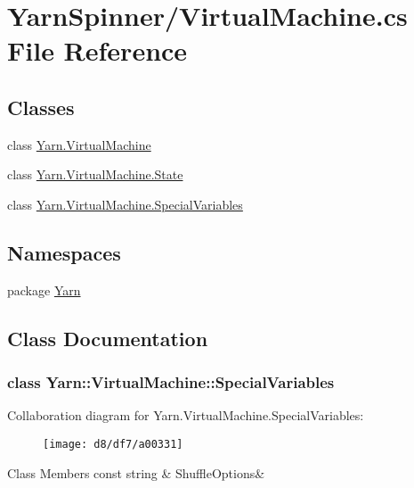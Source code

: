 \hypertarget{a00268}{\section{Yarn\-Spinner/\-Virtual\-Machine.cs File Reference}
\label{a00268}
}
\subsection*{Classes}
\begin{DoxyCompactItemize}
\item 
class \hyperlink{a00136}{Yarn.\-Virtual\-Machine}
\item 
class \hyperlink{a00139}{Yarn.\-Virtual\-Machine.\-State}
\item 
class \hyperlink{a00136_de/dab/a00319}{Yarn.\-Virtual\-Machine.\-Special\-Variables}
\end{DoxyCompactItemize}
\subsection*{Namespaces}
\begin{DoxyCompactItemize}
\item 
package \hyperlink{a00029}{Yarn}
\end{DoxyCompactItemize}


\subsection{Class Documentation}
\label{de/dab/a00319}
\hypertarget{a00136_de/dab/a00319}{}
\subsubsection{class Yarn\-:\-:Virtual\-Machine\-:\-:Special\-Variables}


Collaboration diagram for Yarn.\-Virtual\-Machine.\-Special\-Variables\-:
\nopagebreak
\begin{figure}[H]
\begin{center}
\leavevmode
\texttt{[image: d8/df7/a00331]}
\end{center}
\end{figure}
\begin{DoxyFields}{Class Members}
\hypertarget{a00136_aecbb8ab9becd96457d836100b2818078}{const string}\label{a00136_aecbb8ab9becd96457d836100b2818078}
&
Shuffle\-Options&
\\
\hline

\end{DoxyFields}
